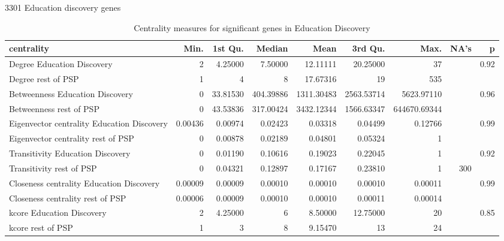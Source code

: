 3301 Education discovery genes
\begin{table}[ht]
\centering
\begin{adjustbox}{width=\textwidth}
\begin{tabular}{lrrrrrrrr}
  \hline
centrality & Min. & 1st Qu. & Median & Mean & 3rd Qu. & Max. & NA's & p \\ 
  \hline
Degree Education Discovery & 2   & 4.25000 & 7.50000 & 12.11111 & 20.25000 & 37   &  & 0.92 \\ 
  Degree rest of PSP & 1   & 4   & 8   & 17.67316 & 19   & 535   &  &  \\ 
  Betweenness Education Discovery & 0   & 33.81530 & 404.39886 & 1311.30483 & 2563.53714 & 5623.97110 &  & 0.96 \\ 
  Betweenness rest of PSP & 0   & 43.53836 & 317.00424 & 3432.12344 & 1566.63347 & 644670.69344 &  & \\ 
  Eigenvector centrality Education Discovery & 0.00436 & 0.00974 & 0.02423 & 0.03318 & 0.04499 & 0.12766 &  & 0.99 \\ 
  Eigenvector centrality rest of PSP & 0   & 0.00878 & 0.02189 & 0.04801 & 0.05324 & 1   &  &  \\ 
  Transitivity Education Discovery & 0   & 0.01190 & 0.10616 & 0.19023 & 0.22045 & 1   &  & 0.92 \\ 
  Transitivity rest of PSP & 0   & 0.04321 & 0.12897 & 0.17167 & 0.23810 & 1   & 300 &  \\ 
  Closeness centrality Education Discovery & 0.00009 & 0.00009 & 0.00010 & 0.00010 & 0.00010 & 0.00011 &  & 0.99 \\ 
  Closeness centrality rest of PSP & 0.00006 & 0.00009 & 0.00010 & 0.00010 & 0.00011 & 0.00014 &  & \\ 
  kcore Education Discovery & 2   & 4.25000 & 6   & 8.50000 & 12.75000 & 20   &  & 0.85 \\ 
  kcore rest of PSP & 1   & 3   & 8   & 9.15470 & 13   & 24   &  &  \\ 
   \hline
\end{tabular}
\end{adjustbox}
\caption{Centrality measures for significant genes in Education Discovery} 
\label{tab:Centrality measures for significant genes in Education Discovery}
\end{table}


